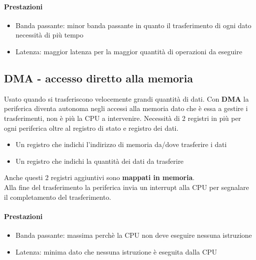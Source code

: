 \documentclass[12pt, a4paper, openany]{book}
\begin{document}
\paragraph*{Prestazioni}
\begin{itemize}
    \item Banda passante: minor banda passante in quanto il trasferimento di ogni dato necessità di più tempo
    \item Latenza: maggior latenza per la maggior quantità di operazioni da eseguire 
\end{itemize}

\subsection*{DMA - accesso diretto alla memoria}
Usato quando si trasferiscono velocemente grandi quantità di dati.
Con \textbf{DMA} la periferica diventa autonoma negli accessi alla memoria dato che è essa a
gestire i trasferimenti, non è più la CPU a intervenire. Necessità di 2 registri in più
per ogni periferica oltre al registro di stato e registro dei dati.
\begin{itemize}
    \item Un registro che indichi l'indirizzo di memoria da/dove trasferire i dati
    \item Un registro che indichi la quantità dei dati da trasferire
\end{itemize}
Anche questi 2 registri aggiuntivi sono \textbf{mappati in memoria}.
\\ Alla fine del trasferimento la periferica invia un interrupt alla CPU per segnalare il completamento 
del trasferimento.
\paragraph*{Prestazioni}
\begin{itemize}
    \item Banda passante: massima perchè la CPU non deve eseguire nessuna istruzione
    \item Latenza: minima dato che nessuna istruzione è eseguita dalla CPU
\end{itemize}

\end{document}

